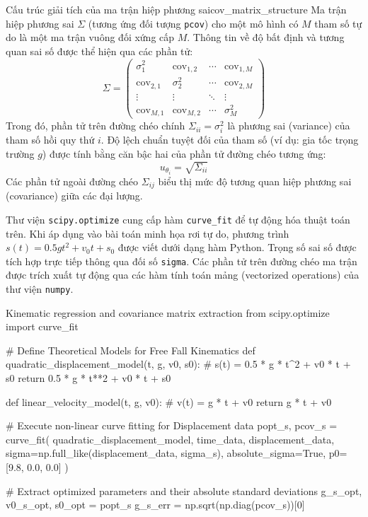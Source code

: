 \begin{derivation}{Cấu trúc giải tích của ma trận hiệp phương sai}{cov_matrix_structure}
Ma trận hiệp phương sai $\Sigma$ (tương ứng đối tượng \texttt{pcov}) cho một mô hình có $M$ tham số tự do là một ma trận vuông đối xứng cấp $M$. Thông tin về độ bất định và tương quan sai số được thể hiện qua các phần tử:
\begin{equation}
    \Sigma = \begin{pmatrix}
    \sigma_{1}^2 & \text{cov}_{1,2} & \cdots & \text{cov}_{1,M} \\
    \text{cov}_{2,1} & \sigma_{2}^2 & \cdots & \text{cov}_{2,M} \\
    \vdots  & \vdots  & \ddots & \vdots  \\
    \text{cov}_{M,1} & \text{cov}_{M,2} & \cdots & \sigma_{M}^2
    \end{pmatrix} \label{eq:covariance_matrix}
\end{equation}
Trong đó, phần tử trên đường chéo chính $\Sigma_{ii} = \sigma_i^2$ là phương sai (variance) của tham số hồi quy thứ $i$. Độ lệch chuẩn tuyệt đối của tham số (ví dụ: gia tốc trọng trường $g$) được tính bằng căn bậc hai của phần tử đường chéo tương ứng:
\begin{equation}
    u_{\theta_i} = \sqrt{\Sigma_{ii}} \label{eq:std_dev_extraction}
\end{equation}
Các phần tử ngoài đường chéo $\Sigma_{ij}$ biểu thị mức độ tương quan hiệp phương sai (covariance) giữa các đại lượng.
\end{derivation}

Thư viện \texttt{scipy.optimize} cung cấp hàm \texttt{curve\_fit} để tự động hóa thuật toán trên. Khi áp dụng vào bài toán minh họa rơi tự do, phương trình $s(t) = 0.5gt^2 + v_0t + s_0$ được viết dưới dạng hàm Python. Trọng số sai số được tích hợp trực tiếp thông qua đối số \texttt{sigma}. Các phần tử trên đường chéo ma trận được trích xuất tự động qua các hàm tính toán mảng (vectorized operations) của thư viện \texttt{numpy}.

\begin{pycode}{Kinematic regression and covariance matrix extraction}
from scipy.optimize import curve_fit

# Define Theoretical Models for Free Fall Kinematics
def quadratic_displacement_model(t, g, v0, s0):
    # s(t) = 0.5 * g * t^2 + v0 * t + s0
    return 0.5 * g * t**2 + v0 * t + s0

def linear_velocity_model(t, g, v0):
    # v(t) = g * t + v0
    return g * t + v0

# Execute non-linear curve fitting for Displacement data
popt_s, pcov_s = curve_fit(
    quadratic_displacement_model,
    time_data,
    displacement_data,
    sigma=np.full_like(displacement_data, sigma_s),
    absolute_sigma=True,
    p0=[9.8, 0.0, 0.0]
)

# Extract optimized parameters and their absolute standard deviations
g_s_opt, v0_s_opt, s0_opt = popt_s
g_s_err = np.sqrt(np.diag(pcov_s))[0]
\end{pycode}

